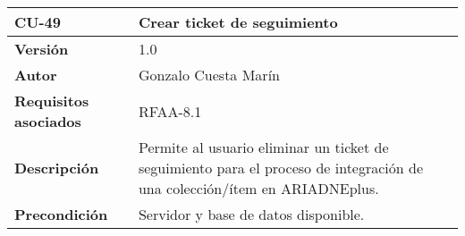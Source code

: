 \begin{longtable}[]{@{}ll@{}}
\toprule
\begin{minipage}[b]{0.16\columnwidth}\raggedright
\textbf{CU-49}\strut
\end{minipage} & \begin{minipage}[b]{0.78\columnwidth}\raggedright
\textbf{Crear ticket de seguimiento}\strut
\end{minipage}\tabularnewline
\midrule
\endhead
\begin{minipage}[t]{0.16\columnwidth}\raggedright
\textbf{Versión}\strut
\end{minipage} & \begin{minipage}[t]{0.78\columnwidth}\raggedright
1.0\strut
\end{minipage}\tabularnewline
\begin{minipage}[t]{0.16\columnwidth}\raggedright
\textbf{Autor}\strut
\end{minipage} & \begin{minipage}[t]{0.78\columnwidth}\raggedright
Gonzalo Cuesta Marín\strut
\end{minipage}\tabularnewline
\begin{minipage}[t]{0.16\columnwidth}\raggedright
\textbf{Requisitos asociados}\strut
\end{minipage} & \begin{minipage}[t]{0.78\columnwidth}\raggedright
RFAA-8.1\strut
\end{minipage}\tabularnewline
\begin{minipage}[t]{0.16\columnwidth}\raggedright
\textbf{Descripción}\strut
\end{minipage} & \begin{minipage}[t]{0.78\columnwidth}\raggedright
Permite al usuario eliminar un ticket de seguimiento para el proceso de
integración de una colección/ítem en ARIADNEplus.\strut
\end{minipage}\tabularnewline
\begin{minipage}[t]{0.16\columnwidth}\raggedright
\textbf{Precondición}\strut
\end{minipage} & \begin{minipage}[t]{0.78\columnwidth}\raggedright
Servidor y base de datos disponible.


\end{minipage}
\end{longtable}
